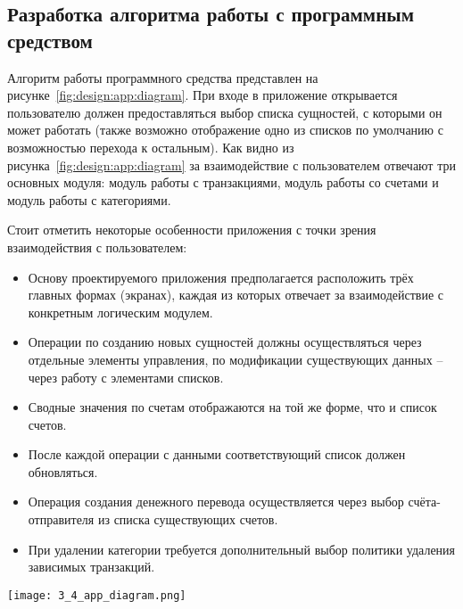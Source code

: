 \subsection{Разработка алгоритма работы с программным средством}
\label{sec:design:app}

Алгоритм работы программного средства представлен на рисунке~\ref{fig:design:app:diagram}.
При входе в приложение открывается пользователю должен предоставляться выбор списка сущностей, с которыми он может работать (также возможно отображение одно из списков по умолчанию с возможностью перехода к остальным).
Как видно из рисунка~\ref{fig:design:app:diagram} за взаимодействие с пользователем отвечают три основных модуля: модуль работы с транзакциями, модуль работы со счетами и модуль работы с категориями.

Стоит отметить некоторые особенности приложения с точки зрения взаимодействия с пользователем:
\begin{itemize}
    \item Основу проектируемого приложения предполагается расположить трёх главных формах (экранах), каждая из которых отвечает за взаимодействие с конкретным логическим модулем.
    \item Операции по созданию новых сущностей должны осуществляться через отдельные элементы управления, по модификации существующих данных -- через работу с элементами списков.
    \item Сводные значения по счетам отображаются на той же форме, что и список счетов.
    \item После каждой операции с данными соответствующий список должен обновляться.
    \item Операция создания денежного перевода осуществляется через выбор счёта-отправителя из списка существующих счетов.
    \item При удалении категории требуется дополнительный выбор политики удаления зависимых транзакций.
\end{itemize}

\begin{sidewaysfigure}
    \centering
    \texttt{[image: 3\_4\_app\_diagram.png]}
    \caption{Схема программного средства}
    \label{fig:design:app:diagram}
\end{sidewaysfigure}

